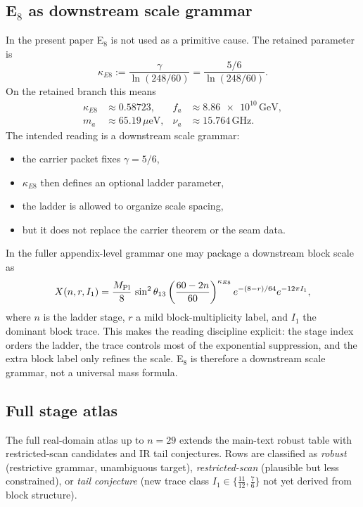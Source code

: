 \subsection{\texorpdfstring{E$_8$}{E8} as downstream scale grammar}

In the present paper E$_8$ is not used as a primitive cause. The retained parameter is
\[
\kappa_{E8}:=\frac{\gamma}{\ln(248/60)}=\frac{5/6}{\ln(248/60)}.
\]
On the retained branch this means
\[
\begin{aligned}
\kappa_{E8}&\approx \num{0.58723},
&
f_a&\approx \num{8.86e10}\,\mathrm{GeV},
\\
m_a&\approx \num{65.19}\,\mu\mathrm{eV},
&
\nu_a&\approx \num{15.764}\,\mathrm{GHz}.
\end{aligned}
\]
The intended reading is a downstream scale grammar:
\begin{itemize}[leftmargin=1.5em, topsep=3pt, itemsep=2pt]
    \item the carrier packet fixes $\gamma=5/6$,
    \item $\kappa_{E8}$ then defines an optional ladder parameter,
    \item the ladder is allowed to organize scale spacing,
    \item but it does not replace the carrier theorem or the seam data.
\end{itemize}
In the fuller appendix-level grammar one may package a downstream block scale as
\[
X(n,r,I_1)=\frac{M_{\mathrm{Pl}}}{8}\,\sin^2\theta_{13}
\left(\frac{60-2n}{60}\right)^{\kappa_{E8}}
e^{-(8-r)/64}e^{-12\pi I_1},
\]
where $n$ is the ladder stage, $r$ a mild block-multiplicity label, and $I_1$ the dominant block trace. This makes the reading discipline explicit: the stage index orders the ladder, the trace controls most of the exponential suppression, and the extra block label only refines the scale. E$_8$ is therefore a downstream scale grammar, not a universal mass formula.

\subsection{Full stage atlas}

The full real-domain atlas up to $n=29$ extends the main-text robust table with restricted-scan candidates and IR tail conjectures. Rows are classified as \emph{robust} (restrictive grammar, unambiguous target), \emph{restricted-scan} (plausible but less constrained), or \emph{tail conjecture} (new trace class $I_1\in\{\frac{11}{12},\frac{7}{6}\}$ not yet derived from block structure).

